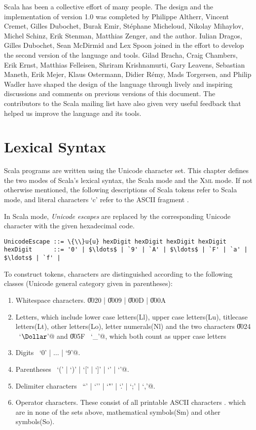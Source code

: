 Scala has been a collective effort of many people. The design and the
implementation of version 1.0 was completed by Philippe Altherr,
Vincent Cremet, Gilles Dubochet, Burak Emir, St\'ephane Micheloud,
Nikolay Mihaylov, Michel Schinz, Erik Stenman, Matthias Zenger, and
the author. Iulian Dragos, Gilles Dubochet, Sean McDirmid and Lex
Spoon joined in the effort to develop the second version of the
language and tools.  Gilad Bracha, Craig Chambers, Erik Ernst,
Matthias Felleisen, Shriram Krishnamurti, Gary Leavens, Sebastian
Maneth, Erik Mejer, Klaus Ostermann, Didier R\'emy, Mads Torgersen, and Philip Wadler
have shaped the design of the language through lively and inspiring
discussions and comments on previous versions of this document.  The
contributors to the Scala mailing list have also given very useful
feedback that helped us improve the language and its tools.

\chapter{Lexical Syntax}

Scala programs are written using the Unicode character set.
This chapter defines the two modes of Scala's lexical syntax, the
Scala mode and the \textsc{Xml} mode. If not otherwise mentioned, the following 
descriptions of Scala tokens refer to Scala mode, and literal characters `c' refer 
to the ASCII fragment . 

In Scala mode, \textit{Unicode escapes} are replaced by the corresponding
Unicode character with the given hexadecimal code.
\begin{lstlisting}
UnicodeEscape ::= \{\\}u{u} hexDigit hexDigit hexDigit hexDigit
hexDigit      ::= '0' | $\ldots$ | `9' | `A' | $\ldots$ | `F' | `a' | $\ldots$ | `f' |
\end{lstlisting}
To construct tokens, characters are distinguished according to the following classes 
(Unicode general category given in parentheses):
\begin{enumerate}
\item Whitespace characters. \U{0020} | \U{0009} | \U{000D} | \U{000A}
\item Letters, which include lower case letters(Ll), upper case letters(Lu), titlecase letters(Lt), other letters(Lo), letter numerals(Nl) and the 
two characters \U{0024} ~\lstinline@`$\Dollar$'@ and \U{005F} ~\lstinline@`_'@, which
both count as upper case letters
\item Digits ~\lstinline@`0' | $\ldots$ | `9'@.
\item Parentheses ~\lstinline@`(' | `)' | `[' | `]' | `{' | `}'@.
\item Delimiter characters ~\lstinline@``' | `'' | `"' | `.' | `;' | `,'@.
\item Operator characters. These consist of all printable ASCII characters . 
which are in none of the sets above, mathematical symbols(Sm) and other symbols(So).
\end{enumerate}
\newpage

